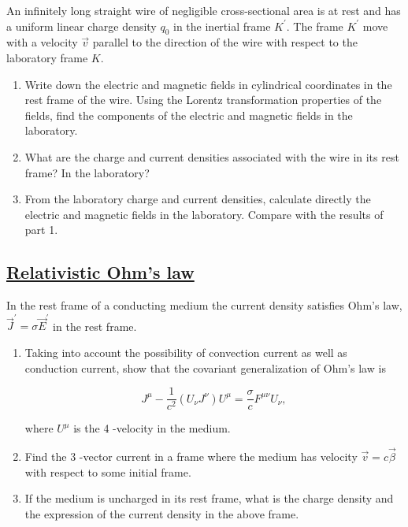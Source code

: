 An infinitely long straight wire of negligible cross-sectional area is at rest and has a uniform linear charge density $q_{0}$ in the inertial frame $K^{\prime} .$ The frame $K^{\prime}$ move with a velocity $\vec{v}$ parallel to the direction of the wire with respect to the laboratory frame $K$.

\begin{enumerate}
	\item Write down the electric and magnetic fields in cylindrical coordinates in the rest frame of the wire. Using the Lorentz transformation properties of the fields, find the components of the electric and magnetic fields in the laboratory.
	\item What are the charge and current densities associated with the wire in its rest frame? In the laboratory?
	\item From the laboratory charge and current densities, calculate directly the electric and magnetic fields in the laboratory. Compare with the results of part 1.
\end{enumerate}

\subsection{\hyperref[Relativistic Ohm's law]{Relativistic Ohm's law}}

In the rest frame of a conducting medium the current density satisfies Ohm's law, $\vec{J}^{\prime}=\sigma \vec{E}^{\prime}$ in the rest frame.

\begin{enumerate}
	\item Taking into account the possibility of convection current as well as conduction current, show that the covariant generalization of Ohm's law is
	
	\begin{equation}
		J^{\mu}-\frac{1}{c^{2}}\left(U_{\nu} J^{\nu}\right) U^{\mu}=\frac{\sigma}{c} F^{\mu \nu} U_{\nu},
	\end{equation}

	where $U^{\mu}$ is the 4 -velocity in the medium.
	\item Find the 3 -vector current in a frame where the medium has velocity $\vec{v}=c \vec{\beta}$ with respect to some initial frame.
	\item If the medium is uncharged in its rest frame, what is the charge density and the expression of the current density in the above frame.
\end{enumerate}

